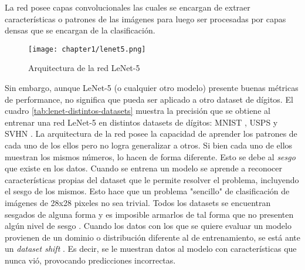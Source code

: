 La red posee capas convolucionales las cuales se encargan de extraer caracter\'isticas o patrones de las im\'agenes
para luego ser procesadas por capas densas que se encargan de la clasificaci\'on.

\begin{figure}[H]
    \centering
    \texttt{[image: chapter1/lenet5.png]}
    \caption{Arquitectura de la red LeNet-5}
    \label{fig:lenet-5}
\end{figure}

Sin embargo, aunque LeNet-5 (o cualquier otro modelo) presente buenas m\'etricas de performance, no significa que pueda
ser aplicado a otro dataset de d\'igitos. El cuadro \ref{tab:lenet-distintos-datasets} muestra la precisi\'on que se
obtiene al entrenar una red LeNet-5 en distintos datasets de d\'igitos: MNIST \parencite{lecun1998gradient}, USPS \parencite{hull1994database} y SVHN \parencite{netzer2011reading}. La arquitectura de la red posee la capacidad de aprender los patrones de cada uno de los
ellos pero no logra generalizar a otros. Si bien cada uno de ellos muestran los mismos n\'umeros, lo hacen de forma
diferente. Esto se debe al {\it sesgo} que existe en los datos. Cuando se entrena un modelo se aprende a reconocer
caracter\'isticas propias del dataset que le permite resolver el problema, incluyendo el sesgo de los mismos. Esto hace
que un problema "sencillo" de clasificaci\'on de im\'agenes de 28x28 pixeles no sea trivial. Todos los datasets se
encuentran sesgados de alguna forma y es imposible armarlos de tal forma que no presenten alg\'un nivel de sesgo \parencite{khosla2012undoing}. Cuando los datos con los que se quiere evaluar un modelo provienen de un dominio o
distribuci\'on diferente al de entrenamiento, se est\'a ante un {\it dataset shift} \parencite{quinonero2008dataset}. Es decir, se le muestran datos al modelo con caracter\'isticas que nunca vi\'o,
provocando predicciones incorrectas.

